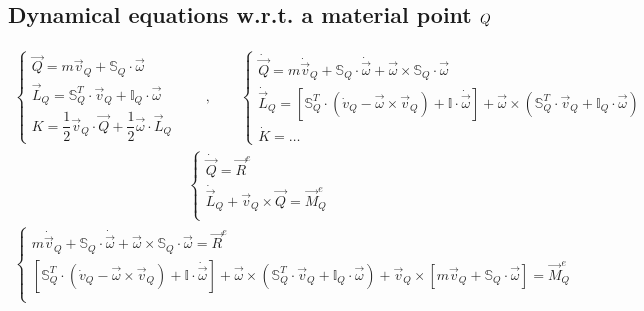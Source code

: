 \documentclass[letterpaper,10pt,english]{jupyterBook}
\begin{document}
\subsection{Dynamical equations w.r.t. a material point \protect\(Q\protect\)}
\label{\detokenize{ch/dynamics-eom-rigid:dynamical-equations-w-r-t-a-material-point-q}}
\sphinxAtStartPar
{}
\begin{equation*}
\begin{split}
\begin{cases}
 \vec{Q} = m \vec{v}_Q + \mathbb{S}_Q \cdot \vec{\omega} \\
 \vec{L}_Q = \mathbb{S}_Q^T \cdot \vec{v}_Q + \mathbb{I}_Q \cdot \vec{\omega} \\
 K = \dfrac{1}{2} \vec{v}_Q \cdot \vec{Q} + \dfrac{1}{2} \vec{\omega} \cdot \vec{L}_Q
\end{cases}
\qquad , \qquad
\begin{cases}
 \dot{\vec{Q}} = m \dot{\vec{v}}_Q + \mathbb{S}_Q \cdot \dot{\vec{\omega}} + \vec{\omega} \times \mathbb{S}_Q \cdot \vec{\omega} \\
 \dot{\vec{L}}_Q =
   \left[ \mathbb{S}_Q^T \cdot \left( \dot{v}_Q - \vec{\omega} \times \vec{v}_Q \right) + \mathbb{I} \cdot \dot{\vec{\omega}} \right] 
 + \vec{\omega} \times ( \mathbb{S}_Q^T \cdot \vec{v}_Q + \mathbb{I}_Q \cdot \vec{\omega} ) \\
 \dot{K} = \dots
\end{cases}
\end{split}
\end{equation*}
\sphinxAtStartPar
{}
\begin{equation*}
\begin{split}
\begin{cases}
 \dot{\vec{Q}} = \vec{R}^e \\
 \dot{\vec{L}}_Q + \vec{v}_Q \times \vec{Q} = \vec{M}_Q^e \\
\end{cases}
\end{split}
\end{equation*}\begin{equation*}
\begin{split}
\begin{cases}
 m \dot{\vec{v}}_Q + \mathbb{S}_Q \cdot \dot{\vec{\omega}} + \vec{\omega} \times \mathbb{S}_Q \cdot \vec{\omega} = \vec{R}^e \\
 \left[ \mathbb{S}_Q^T \cdot \left( \dot{v}_Q - \vec{\omega} \times \vec{v}_Q \right) + \mathbb{I} \cdot \dot{\vec{\omega}} \right] 
 + \vec{\omega} \times ( \mathbb{S}_Q^T \cdot \vec{v}_Q + \mathbb{I}_Q \cdot \vec{\omega} ) + \vec{v}_Q \times \left[  m \vec{v}_Q + \mathbb{S}_Q \cdot \vec{\omega}   \right] = \vec{M}_Q^e \\
\end{cases}
\end{split}
\end{equation*}
\end{document}
